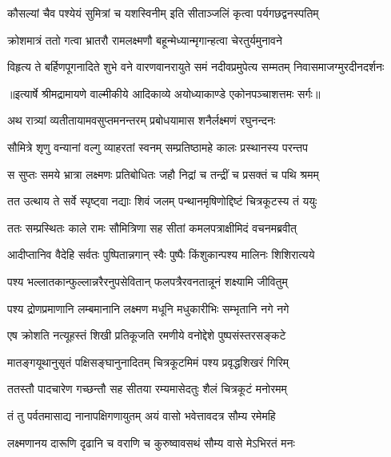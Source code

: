 \twolineshloka
{कौसल्यां चैव पश्येयं सुमित्रां च यशस्विनीम्}
{इति सीताञ्जलिं कृत्वा पर्यगछद्वनस्पतिम्} %

\twolineshloka
{क्रोशमात्रं ततो गत्वा भ्रातरौ रामलक्ष्मणौ}
{बहून्मेध्यान्मृगान्हत्वा चेरतुर्यमुनावने} %

\fourlineindentedshloka
{विहृत्य ते बर्हिणपूगनादिते}
{शुभे वने वारणवानरायुते}
{समं नदीवप्रमुपेत्य सम्मतम्}
{निवासमाजग्मुरदीनदर्शनः} %


{॥इत्यार्षे श्रीमद्रामायणे वाल्मीकीये आदिकाव्ये अयोध्याकाण्डे एकोनपञ्चाशत्तमः सर्गः॥}


\twolineshloka
{अथ रात्र्यां व्यतीतायामवसुप्तमनन्तरम्}
{प्रबोधयामास शनैर्लक्ष्मणं रघुनन्दनः} %

\twolineshloka
{सौमित्रे शृणु वन्यानां वल्गु व्याहरतां स्वनम्}
{सम्प्रतिष्ठामहे कालः प्रस्थानस्य परन्तप} %

\twolineshloka
{स सुप्तः समये भ्रात्रा लक्ष्मणः प्रतिबोधितः}
{जहौ निद्रां च तन्द्रीं च प्रसक्तं च पथि श्रमम्} %

\twolineshloka
{तत उत्थाय ते सर्वे स्पृष्ट्वा नद्याः शिवं जलम्}
{पन्थानमृषिणोद्दिष्टं चित्रकूटस्य तं ययुः} %

\twolineshloka
{ततः सम्प्रस्थितः काले रामः सौमित्रिणा सह}
{सीतां कमलपत्राक्षीमिदं वचनमब्रवीत्} %

\twolineshloka
{आदीप्तानिव वैदेहि सर्वतः पुष्पितान्नगान्}
{स्वैः पुष्पैः किंशुकान्पश्य मालिनः शिशिरात्यये} %

\twolineshloka
{पश्य भल्लातकान्फुल्लान्नरैरनुपसेवितान्}
{फलपत्रैरवनतान्नूनं शक्ष्यामि जीवितुम्} %

\twolineshloka
{पश्य द्रोणप्रमाणानि लम्बमानानि लक्ष्मण}
{मधूनि मधुकारीभिः सम्भृतानि नगे नगे} %

\twolineshloka
{एष क्रोशति नत्यूहस्तं शिखी प्रतिकूजति}
{रमणीये वनोद्देशे पुष्पसंस्तरसङ्कटे} %

\twolineshloka
{मातङ्गयूथानुसृतं पक्षिसङ्घानुनादितम्}
{चित्रकूटमिमं पश्य प्रवृद्धशिखरं गिरिम्} %

\twolineshloka
{ततस्तौ पादचारेण गच्छन्तौ सह सीतया}
{रम्यमासेदतुः शैलं चित्रकूटं मनोरमम्} %

\twolineshloka
{तं तु पर्वतमासाद्य नानापक्षिगणायुतम्}
{अयं वासो भवेत्तावदत्र सौम्य रमेमहि} %

\twolineshloka
{लक्ष्मणानय दारूणि दृढानि च वराणि च}
{कुरुष्वावसथं सौम्य वासे मेऽभिरतं मनः} %

